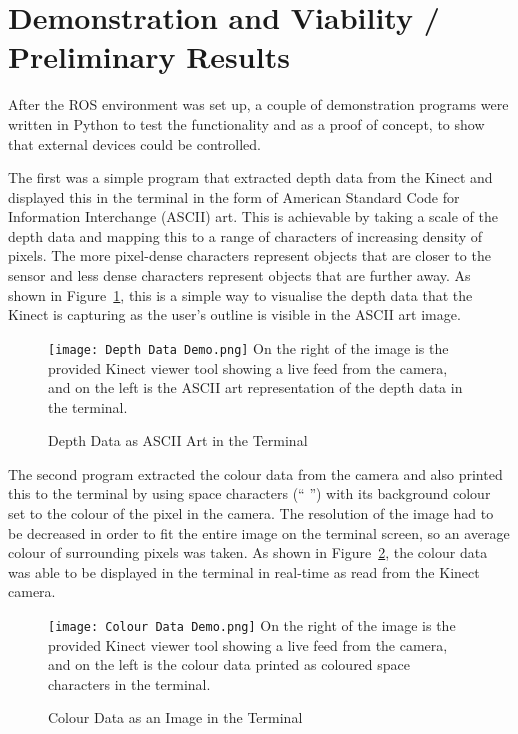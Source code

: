\newpage

\section{Demonstration and Viability / Preliminary Results}

After the ROS environment was set up, a couple of demonstration programs were written in Python to test the functionality and as a proof of concept, to show that external devices could be controlled.

The first was a simple program that extracted depth data from the Kinect and displayed this in the terminal in the form of American Standard Code for Information Interchange (ASCII) art.
This is achievable by taking a scale of the depth data and mapping this to a range of characters of increasing density of pixels.
The more pixel-dense characters represent objects that are closer to the sensor and less dense characters represent objects that are further away.
As shown in Figure~\ref{fig:depth_ascii}, this is a simple way to visualise the depth data that the Kinect is capturing as the user's outline is visible in the ASCII art image.

\begin{figure}[!htb]
    \caption{Depth Data as ASCII Art in the Terminal}
    \texttt{[image: Depth Data Demo.png]}
    \small
    On the right of the image is the provided Kinect viewer tool showing a live feed from the camera, and on the left is the ASCII art representation of the depth data in the terminal.
    \label{fig:depth_ascii}
\end{figure}

The second program extracted the colour data from the camera and also printed this to the terminal by using space characters (`` '') with its background colour set to the colour of the pixel in the camera.
The resolution of the image had to be decreased in order to fit the entire image on the terminal screen, so an average colour of surrounding pixels was taken.
As shown in Figure~\ref{fig:colour_image}, the colour data was able to be displayed in the terminal in real-time as read from the Kinect camera.

\begin{figure}[!htb]
    \caption{Colour Data as an Image in the Terminal}
    \texttt{[image: Colour Data Demo.png]}
    \small
    On the right of the image is the provided Kinect viewer tool showing a live feed from the camera, and on the left is the colour data printed as coloured space characters in the terminal.
    \label{fig:colour_image}
\end{figure}

